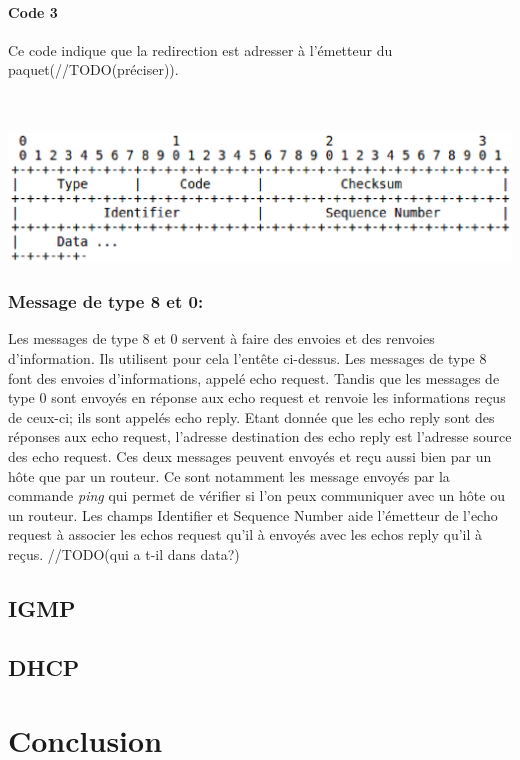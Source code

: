 \documentclass[twoside,openright,a4paper,11pt,french]{article}
\begin{document}
\paragraph{Code 3}
Ce code indique que la redirection est adresser à l'émetteur du paquet(//TODO(préciser)).

\\
\\
\includegraphics[width=15cm]{./pics/header3.eps}
\\

\subsubsection{Message de type 8 et 0:}
Les messages de type 8 et 0 servent à faire des envoies et des renvoies d'information. Ils utilisent pour cela l'entête ci-dessus. Les messages de type 8 font des envoies d'informations, appelé echo request. Tandis que les messages de type 0 sont envoyés en réponse aux echo request et renvoie les informations reçus de ceux-ci; ils sont appelés echo reply. Etant donnée que les echo reply sont des réponses aux echo request, l'adresse destination des echo reply est l'adresse source des echo request. Ces deux messages peuvent envoyés et reçu aussi bien par un hôte que par un routeur. Ce sont notamment les message envoyés par la commande {\it ping} qui permet de vérifier si l'on peux communiquer avec un hôte ou un routeur.
Les champs Identifier et Sequence Number aide l'émetteur de l'echo request à associer les echos request qu'il à envoyés avec les echos reply qu'il à reçus.
//TODO(qui a t-il dans data?)
\subsection{IGMP}
\subsection{DHCP}







\section{Conclusion}
\label{sec:ccl}

\cleardoublepage
{}


\end{document}
